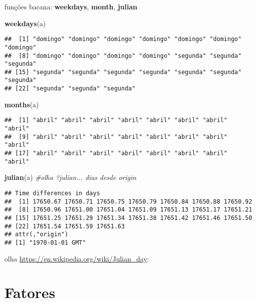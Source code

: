 \documentclass[]{book}
\newenvironment{Shaded}{\begin{snugshade}}{\end{snugshade}}
\newcommand{\KeywordTok}[1]{\textcolor[rgb]{0.13,0.29,0.53}{\textbf{#1}}}
\newcommand{\CommentTok}[1]{\textcolor[rgb]{0.56,0.35,0.01}{\textit{#1}}}
\newcommand{\NormalTok}[1]{#1}
\theoremstyle{definition}
\theoremstyle{definition}
\theoremstyle{definition}
\theoremstyle{remark}
\begin{document}
funções bacana: \textbf{weekdays}, \textbf{month}, \textbf{julian}

\begin{Shaded}
\begin{Highlighting}[]
\KeywordTok{weekdays}\NormalTok{(a)}
\end{Highlighting}
\end{Shaded}

\begin{verbatim}
##  [1] "domingo" "domingo" "domingo" "domingo" "domingo" "domingo" "domingo"
##  [8] "domingo" "domingo" "domingo" "domingo" "segunda" "segunda" "segunda"
## [15] "segunda" "segunda" "segunda" "segunda" "segunda" "segunda" "segunda"
## [22] "segunda" "segunda" "segunda"
\end{verbatim}

\begin{Shaded}
\begin{Highlighting}[]
\KeywordTok{months}\NormalTok{(a)}
\end{Highlighting}
\end{Shaded}

\begin{verbatim}
##  [1] "abril" "abril" "abril" "abril" "abril" "abril" "abril" "abril"
##  [9] "abril" "abril" "abril" "abril" "abril" "abril" "abril" "abril"
## [17] "abril" "abril" "abril" "abril" "abril" "abril" "abril" "abril"
\end{verbatim}

\begin{Shaded}
\begin{Highlighting}[]
\KeywordTok{julian}\NormalTok{(a) }\CommentTok{#olha ?julian... dias desde origin}
\end{Highlighting}
\end{Shaded}

\begin{verbatim}
## Time differences in days
##  [1] 17650.67 17650.71 17650.75 17650.79 17650.84 17650.88 17650.92
##  [8] 17650.96 17651.00 17651.04 17651.09 17651.13 17651.17 17651.21
## [15] 17651.25 17651.29 17651.34 17651.38 17651.42 17651.46 17651.50
## [22] 17651.54 17651.59 17651.63
## attr(,"origin")
## [1] "1970-01-01 GMT"
\end{verbatim}

olha \url{https://en.wikipedia.org/wiki/Julian_day}:

\section{Fatores}\label{fatores}
\end{document}
